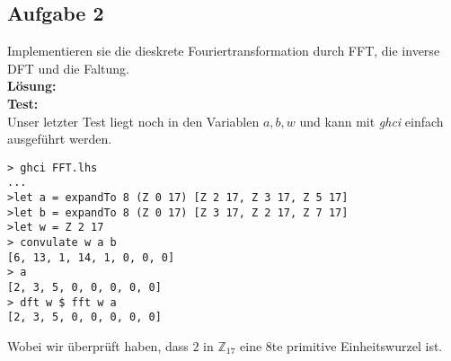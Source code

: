 \documentclass[11pt,a4paper,ngerman]{article}
\begin{document}
\subsection*{Aufgabe 2}

Implementieren sie die dieskrete Fouriertransformation durch FFT, die inverse DFT und die Faltung.\\

\textbf{Lösung:}\\



\textbf{Test:}\\
Unser letzter Test
liegt noch in den Variablen $a,b,w$ und kann mit \emph{ghci}
einfach ausgeführt werden.
\begin{lstlisting}
> ghci FFT.lhs
...
>let a = expandTo 8 (Z 0 17) [Z 2 17, Z 3 17, Z 5 17]
>let b = expandTo 8 (Z 0 17) [Z 3 17, Z 2 17, Z 7 17]
>let w = Z 2 17
> convulate w a b
[6, 13, 1, 14, 1, 0, 0, 0]
> a
[2, 3, 5, 0, 0, 0, 0, 0]
> dft w $ fft w a
[2, 3, 5, 0, 0, 0, 0, 0]
\end{lstlisting}

Wobei wir überprüft haben, dass $2$ in $\mathbb{Z}_{17}$ eine $8$te primitive Einheitswurzel ist.

\label{LastPage}
\end{document}
